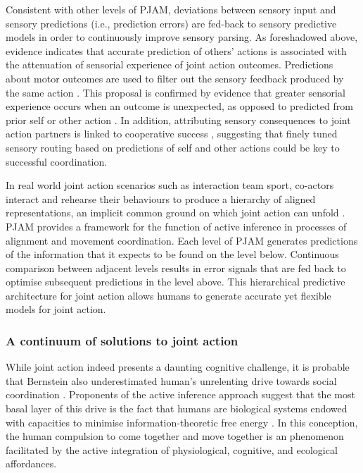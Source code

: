 \begin{CJK}{UTF8}{gbsn}
Consistent with other levels of PJAM, deviations between sensory input and sensory predictions (i.e., prediction errors) are fed-back to sensory predictive models in order to continuously improve sensory parsing.  As foreshadowed above, evidence indicates that accurate prediction of others' actions is associated with the attenuation of sensorial experience of joint action outcomes.  Predictions about motor outcomes are used to filter out the sensory feedback produced by the same action \citep{Blakemore1999}.  This proposal is confirmed by evidence that greater sensorial experience occurs when an outcome is unexpected, as opposed to predicted from prior self or other action \citep{Sato2008}.  In addition, attributing sensory consequences to joint action partners is linked to cooperative success \citep{Chaminade2012}, suggesting that finely tuned sensory routing based on predictions of self and other actions could be key to successful coordination.

In real world joint action scenarios such as interaction team sport, co-actors interact and rehearse their behaviours to produce a hierarchy of aligned representations, an implicit common ground on which joint action can unfold \citep{Noy2017}.  PJAM provides a framework for the function of active inference in processes of alignment and movement coordination.  Each level of PJAM generates predictions of the information that it expects to be found on the level below.  Continuous comparison between adjacent levels results in error signals that are fed back to optimise subsequent predictions in the level above.  This hierarchical predictive architecture for joint action allows humans to generate accurate yet flexible models for joint action.


\subsubsection{A continuum of solutions to joint action}

While joint action indeed presents a daunting cognitive challenge, it is probable that Bernstein also underestimated human's unrelenting drive towards social coordination \citep{Tomasello2005}.  Proponents of the active inference approach suggest that the most basal layer of this drive is the fact that humans are biological systems endowed with capacities to minimise information-theoretic free energy \citep{Friston2010}.  In this conception, the human compulsion to come together and move together is an phenomenon facilitated by the active integration of physiological, cognitive, and ecological affordances.


\end{CJK}
